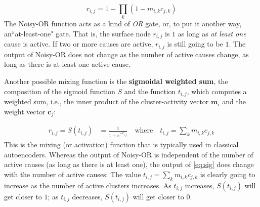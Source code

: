 \begin{equation}\label{eq:noisy-or}
r_{i,j} = 1 - \prod\limits_{k} (1 - m_{i,k} c_{j,k})
\end{equation}
 The Noisy-OR function acts as a kind of \textit{OR} gate, or, to put it another way, 
 an``at-least-one" gate. That is, the surface node $r_{i,j}$ is $1$ as long as 
 \emph{at least one} cause is active.
 If two or more causes are active,
$r_{i,j}$ is still going to be $1$. The output of Noisy-OR does not change 
as the number of active causes change, as long as there is at least one active cause.

Another possible mixing function is the \textbf{sigmoidal weighted sum}, 
the composition of the sigmoid function $S$ and the function $t_{i,j}$, 
which computes a weighted sum, i.e., the inner product of the cluster-activity 
vector $\mathbf{m}_i$ and the weight vector $\mathbf{c}_j$:

	\begin{align} %
	\label{eq:sig}
	r_{i,j} = S(t_{i,j}) &= \frac{1}{1 + e^{-t_{i,j}}} \quad %
	\text{where} \quad t_{i,j} = \sum_k m_{i,k} c_{j,k}
	\end{align}
This is the mixing (or activation) function that is typically used in classical autoencoders. 
Whereas the output of Noisy-OR is independent of the number of active 
causes (as long as there is at least one), the output of \eqref{eq:sig} does
change with the number of active causes: The value $t_{i,j} = \sum_k m_{i,k} c_{j,k}$ 
is clearly going to increase as the number of active clusters increases.
As $t_{i,j}$ increases, $S(t_{i,j})$ will get closer to $1$; as %
$t_{i,j}$ decreases, $S(t_{i,j})$ will get closer to $0$.

